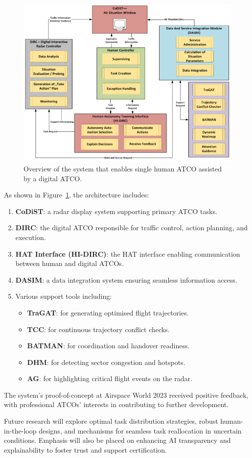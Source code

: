 \begin{figure}[!ht]
    \centering
    \includegraphics[width=.7\textwidth]{img/digital-atco.png}
    \caption{Overview of the system that enables single human \gls{ATCO} assisted by a digital \gls{ATCO}. \cite{Jameel_2023}}
    \label{digital-atco}
\end{figure}

As shown in Figure~\ref{digital-atco}, the architecture includes:
\begin{enumerate}
    \item \textbf{\gls{CoDiST}}: a radar display system supporting primary \gls{ATCO} tasks.
    \item \textbf{\gls{DIRC}}: the digital \gls{ATCO} responsible for traffic control, action planning, and execution.
    \item \textbf{\gls{HAT} Interface (HI-DIRC)}: the \gls{HAT} interface enabling communication between human and digital \glspl{ATCO}.
    \item \textbf{\gls{DASIM}}: a data integration system ensuring seamless information access.
    \item Various support tools including:
        \begin{itemize}
            \item \textbf{\gls{TraGAT}}: for generating optimised flight trajectories.
            \item \textbf{\gls{TCC}}: for continuous trajectory conflict checks.
            \item \textbf{\gls{BATMAN}}: for coordination and handover readiness.
            \item \textbf{\gls{DHM}}: for detecting sector congestion and hotspots.
            \item \textbf{\gls{AG}}: for highlighting critical flight events on the radar.
        \end{itemize}
\end{enumerate}

The system's proof-of-concept at Airspace World 2023 received positive feedback, with professional \glspl{ATCO}' interests in contributing to further development.

Future research will explore optimal task distribution strategies, robust human-in-the-loop designs, and mechanisms for seamless task reallocation in uncertain conditions.
Emphasis will also be placed on enhancing \gls{AI} transparency and explainability to foster trust and support certification.

